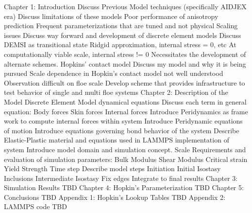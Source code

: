 \label{app:Outline}
\begin{outline}[enumerate]
\1 Chapter 1: Introduction
\2 Discuss Previous Model techniques (specifically AIDJEX era)
\2 Discuss limitations of these models
\3 Poor performance of anisotropy prediction
\3 Frequent parameterizations that are tuned and not physical
\3 Scaling issues
\2 Discuss way forward and development of discrete element models
\2 Discuss DEMSI as transitional state
\3 Ridgid approximation, internal stress = 0, etc
\3 At computationally viable scale, internal stress != 0
\4 Necessitates the development of alternate schemes.
\3 Hopkins' contact model
\2 Discuss my model and why it is being pursued
\3 Scale dependence in Hopkin's contact model not well understood
\3 Observation difficult on floe scale
\3 Develop scheme that provides infrastructure to test behavior of single and multi floe systems
\1 Chapter 2: Description of the Model
\2 Discrete Element Model dynamical equations
\3 Discuss each term in general equation:
\4 Body forces
\4 Skin forces
\4 Internal forces
\3 Introduce Peridynamics as frame work to compute internal forces within system
\4 Introduce Peridynamic equations of motion
\4 Introduce equations governing bond behavior of the system
\4 Describe Elastic-Plastic material and equations used in LAMMPS implementation of system
\3 Introduce model domain and simulation concept.
\4 Scale Requirements and evaluation of simulation parameters:
\4 Bulk Modulus
\4 Shear Modulus
\4 Critical strain
\4 Yield Strength
\4 Time step
\3 Describe model steps
\4 Initiation
\4 Initial Isostasy
\4 Inclusions
\4 Intermediate Isostasy
\4 Fix edges
\4 Integrate to final results
\1 Chapter 3: Simulation Results
\2 TBD
\1 Chapter 4: Hopkin's Parameterization
\2 TBD
\1 Chapter 5: Conclusions
\2 TBD
\1 Appendix 1: Hopkin's Lookup Tables
\2 TBD
\1 Appendix 2: LAMMPS code
\2 TBD
\end{outline}